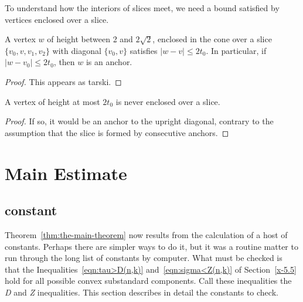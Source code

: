 






To understand how the interiors of slices meet, we
need a bound satisfied by vertices enclosed over a slice.


\begin{lemma}
    \label{lemma:anc-simplex-not-enc}
A vertex $w$ of height between 2 and $2\sqrt{2}$, enclosed in the cone
over a slice $\{v_0,v,v_1,v_2\}$ with diagonal $\{v_0,v\}$ satisfies
$|w-v|\le 2t_0$. In particular, if $|w-v_0|\le 2t_0$, then $w$ is an anchor.
\end{lemma}

\begin{proof}
This appears as tarski.
\end{proof}


\begin{corollary}
A vertex of height at most $2t_0$ is never enclosed over a slice.
\end{corollary}

\begin{proof}  If so, it would be an anchor to the upright diagonal, contrary to
the assumption that the slice is formed by consecutive
anchors.
\end{proof}


\section{Main Estimate}

\subsection{constant} %

Theorem~\ref{thm:the-main-theorem} now results from the calculation of a
host of constants. Perhaps there are simpler ways to do it, but it was a
routine matter to run through the long list of constants by computer.
What must be checked is that the Inequalities~\ref{eqn:tau>D(n,k)}
and~\ref{eqn:sigma<Z(n,k)} of Section~\ref{x-5.5} hold for all possible
convex substandard components. Call these inequalities the {\it D} and {\it Z}
inequalities.  This section describes in detail the constants to check.

